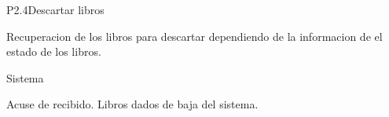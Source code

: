 \begin{Proceso}{P2.4}{Descartar libros }
   { %
  	\begin{UClist}
  		\UCli Recuperacion de los libros para descartar dependiendo de la informacion de el estado de los libros.
     	
    \end {UClist}
  }
  
   { %
    Sistema
  }

   { %
    \begin{UClist}
    
      \UCli Acuse de recibido.
      \UCli Libros dados de baja del sistema.
  
    \end{UClist}
  }

   { %
  }

   { %
  
  }
   { %
  }


\end{Proceso}

